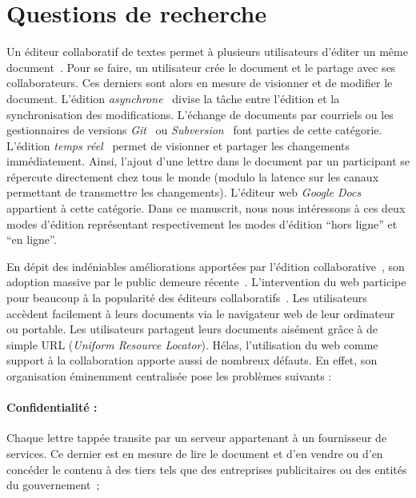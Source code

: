 
\section{Questions de recherche}

Un éditeur collaboratif de textes permet à plusieurs utilisateurs d'éditer un
même document~\cite{ellis1989concurrency}. Pour se faire, un utilisateur crée le
document et le partage avec ses collaborateurs. Ces derniers sont alors en
mesure de visionner et de modifier le document. L'édition
\emph{asynchrone}~\cite{johansen1988groupware} divise la tâche entre l'édition
et la synchronisation des modifications. L'échange de documents par courriels ou
les gestionnaires de versions \emph{Git}~\cite{git} ou
\emph{Subversion}~\cite{svn} font parties de cette catégorie. L'édition
\emph{temps réel}~\cite{ellis1991groupware, johansen1988groupware} permet de
visionner et partager les changements immédiatement. Ainsi, l'ajout d'une lettre
dans le document par un participant se répercute directement chez tous le monde
(modulo la latence sur les canaux permettant de transmettre les
changements). L'éditeur web \emph{Google Docs}~\cite{googledocs} appartient à
cette catégorie.  Dans ce manuscrit, nous nous intéressons à ces deux modes
d'édition représentant respectivement les modes d'édition ``hors ligne'' et ``en
ligne''.

En dépit des indéniables améliorations apportées par l'édition
collaborative~\cite{noel2004empirical}, son adoption massive par le public
demeure récente~\cite{perkel2014scientific}. L'intervention du web participe
pour beaucoup à la popularité des éditeurs
collaboratifs~\cite{mogan2010impact}. Les utilisateurs accèdent facilement à
leurs documents via le navigateur web de leur ordinateur ou portable.  Les
utilisateurs partagent leurs documents aisément grâce à de simple URL
(\emph{Uniform Resource Locator}). Hélas, l'utilisation du web comme support à
la collaboration apporte aussi de nombreux défauts. En effet, son organisation
éminemment centralisée pose les problèmes suivants :

\paragraph{Confidentialité :} Chaque lettre tappée transite par un serveur
appartenant à un fournisseur de services. Ce dernier est en mesure de lire le
document et d'en vendre ou d'en concéder le contenu à des tiers tels que des
entreprises publicitaires ou des entités du gouvernement~\cite{gellman2013us};

